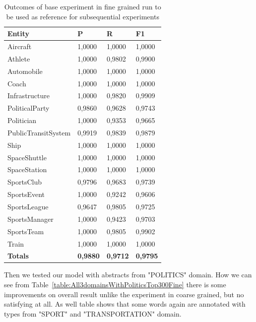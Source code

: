\documentclass[thesis=M,english]{FITthesis}[2018/05/30]
\begin{document}
\begin{table}[H]\centering
		\begin{tabular}{|l|l|l|l|}
			\hline {\textbf{Entity}} & {\textbf{P}} & {\textbf{R}} & {\textbf{F1}}\\\hline
				Aircraft & 1,0000 & 1,0000 & 1,0000\\
				Athlete & 1,0000 & 0,9802 & 0,9900\\
				Automobile & 1,0000 & 1,0000 & 1,0000\\ 
				Coach & 1,0000 & 1,0000 & 1,0000\\
				Infrastructure & 1,0000 & 0,9820 & 0,9909\\
				PoliticalParty & 0,9860 & 0,9628 & 0,9743\\
				Politician & 1,0000 & 0,9353 & 0,9665\\
				PublicTransitSystem & 0,9919 & 0,9839 & 0,9879\\
				Ship & 1,0000 & 1,0000 & 1,0000\\
				SpaceShuttle & 1,0000 & 1,0000 & 1,0000\\
				SpaceStation & 1,0000 & 1,0000 & 1,0000\\ 
				SportsClub & 0,9796 & 0,9683 & 0,9739\\
				SportsEvent & 1,0000 & 0,9242 & 0,9606\\
				SportsLeague & 0,9647 & 0,9805 & 0,9725\\
				SportsManager & 1,0000 & 0,9423 & 0,9703\\
				SportsTeam & 1,0000 & 0,9805 & 0,9902\\
				Train & 1,0000 & 1,0000 & 1,0000\\\hline
				\textbf{Totals} & \textbf{0,9880} & \textbf{0,9712} & \textbf{0,9795}\\\hline
		\end{tabular}
		\caption{Outcomes of base experiment in fine grained run to be used as reference for subsequential experiments \label{table:All3domainsWithAll3DomainsTop300Fine}}
	\end{table}

Then we tested our model with abstracts from "POLITICS" domain. How we can see from Table~\ref{table:All3domainsWithPoliticsTop300Fine} there is some improvements on overall result unlike the experiment in coarse grained, but no satisfying at all. As well table shows that some words again are annotated with types from "SPORT" and "TRANSPORTATION" domain.
\end{document}
